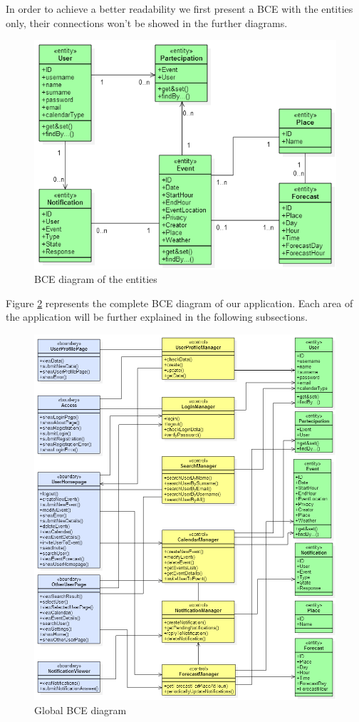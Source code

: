 \documentclass[10pt,a4paper,titlepage]{article}
\begin{document}
In order to achieve a better readability we first present a BCE with the entities only, their connections won't be showed in the further diagrams.
\begin{figure}[h!]
\centering
\includegraphics[width=\linewidth]{./bce/entities_bce}
\caption[Entities BCE]{BCE diagram of the entities}
\label{fig:entities_bce}
\end{figure}
 

Figure \ref{fig:global_bce} represents the complete BCE diagram of our application. Each area of the application will be further explained in the following subsections.
\begin{figure}[p]
\centering
\includegraphics[width=\linewidth]{./bce/global_bce}
\caption[global bce]{Global BCE diagram}
\label{fig:global_bce}
\end{figure}
\clearpage
\end{document}
